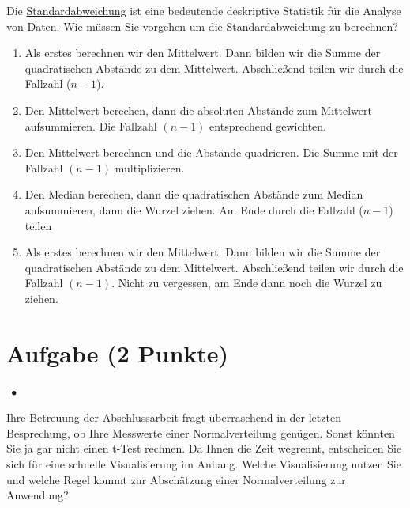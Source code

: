\documentclass[a4paper, 9pt]{scrartcl}\usepackage[]{graphicx}\usepackage[]{xcolor}
\begin{document}
{Die \uline{Standardabweichung} ist eine bedeutende deskriptive Statistik für die Analyse von Daten. Wie müssen Sie vorgehen um die Standardabweichung zu berechnen?



\begin{enumerate}
\item [\textbf{A} \msquare] Als erstes berechnen wir den Mittelwert. Dann bilden wir die Summe der quadratischen Abstände zu dem Mittelwert. Abschließend teilen wir durch die Fallzahl ($n-1$).
\item [\textbf{B} \msquare] Den Mittelwert berechen, dann die absoluten Abstände zum Mittelwert aufsummieren. Die Fallzahl $(n-1)$ entsprechend gewichten.
\item [\textbf{C} \msquare] Den Mittelwert berechnen und die Abstände quadrieren. Die Summe mit der Fallzahl $(n-1)$ multiplizieren.
\item [\textbf{D} \msquare] Den Median berechen, dann die quadratischen Abstände zum Median aufsummieren, dann die Wurzel ziehen. Am Ende durch die Fallzahl ($n-1$) teilen
\item [\textbf{E} \msquare] Als erstes berechnen wir den Mittelwert. Dann bilden wir die Summe der quadratischen Abstände zu dem Mittelwert. Abschließend teilen wir durch die Fallzahl $(n-1)$. Nicht zu vergessen, am Ende dann noch die Wurzel zu ziehen.
\end{enumerate} 

\section{Aufgabe \hfill (2 Punkte)}


\ifcollection
\begin{flushright}
\tiny\vspace{-2Ex}
\textbf{\examinhaltstart}
\exammodulestatversuch $\;\bullet$
\exammodulebiostat
\vspace{-1Ex}
\end{flushright}
\fi




Ihre Betreuung der Abschlussarbeit fragt überraschend in der letzten Besprechung, ob Ihre Messwerte einer Normalverteilung genügen. Sonst könnten Sie ja gar nicht einen t-Test rechnen. Da Ihnen die Zeit wegrennt, entscheiden Sie sich für eine schnelle Visualisierung im Anhang. Welche Visualisierung nutzen Sie und welche Regel kommt zur Abschätzung einer Normalverteilung zur Anwendung?



}
\end{document}
